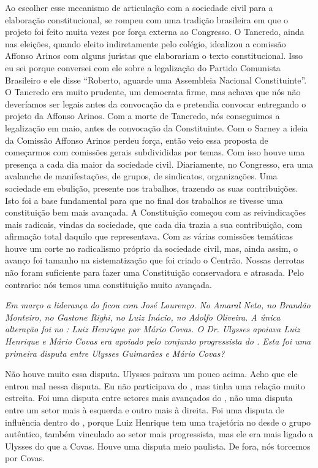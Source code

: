 Ao escolher esse mecanismo de articulação com a
sociedade civil para a elaboração constitucional, se rompeu com uma
tradição brasileira em que o projeto foi feito muita vezes por força
externa ao Congresso. O Tancredo, ainda nas eleições, quando eleito
indiretamente pelo colégio, idealizou a comissão Affonso Arinos com
alguns juristas que elaborariam o texto constitucional. Isso eu sei
porque conversei com ele sobre a legalização do Partido Comunista
Brasileiro e ele disse ``Roberto, aguarde uma Assembleia Nacional
Constituinte''. O Tancredo era muito prudente, um democrata firme, mas
achava que nós não deveríamos ser legais antes da convocação da  e
pretendia convocar entregando o projeto da Affonso Arinos. Com a morte
de Tancredo, nós conseguimos a legalização em maio, antes de convocação
da Constituinte. Com o Sarney a ideia da Comissão Affonso Arinos perdeu
força, então veio essa proposta de começarmos com comissões gerais
subdivididas por temas. Com isso houve uma presença a cada dia maior da
sociedade civil. Diariamente, no Congresso, era uma avalanche de
manifestações, de grupos, de sindicatos, organizações. Uma sociedade em
ebulição, presente nos trabalhos, trazendo as suas contribuições. Isto
foi a base fundamental para que no final dos trabalhos se tivesse uma
constituição bem mais avançada. A Constituição começou com as
reivindicações mais radicais, vindas da sociedade, que cada dia trazia a
sua contribuição, com afirmação total daquilo que representava. Com as
várias comissões temáticas houve um corte no radicalismo próprio da
sociedade civil, mas, ainda assim, o avanço foi tamanho na
sistematização que foi criado o Centrão. Nossas derrotas não foram
suficiente para fazer uma Constituição conservadora e atrasada. Pelo
contrario: nós temos uma constituição muito avançada.

\medskip

\noindent\emph{Em março a liderança do  ficou com José Lourenço. No 
Amaral Neto, no  Brandão Monteiro, no  Gastone Righi, no  Luiz
Inácio, no  Adolfo Oliveira. A única alteração foi no : Luiz
Henrique por Mário Covas. O Dr. Ulysses apoiava Luiz Henrique e Mário
Covas era apoiado pelo conjunto progressista do . Esta foi uma
primeira disputa entre Ulysses Guimarães e Mário Covas?}

Não houve muito essa disputa. Ulysses pairava um pouco
acima. Acho que ele entrou mal nessa disputa. Eu não participava do
, mas tinha uma relação muito estreita. Foi uma disputa entre
setores mais avançados do , não uma disputa entre um setor mais à
esquerda e outro mais à direita. Foi uma disputa de influência dentro do
, porque Luiz Henrique tem uma trajetória no  desde o grupo
autêntico, também vinculado ao setor mais progressista, mas ele era mais
ligado a Ulysses do que a Covas. Houve uma disputa meio paulista. De
fora, nós torcemos por Covas.

